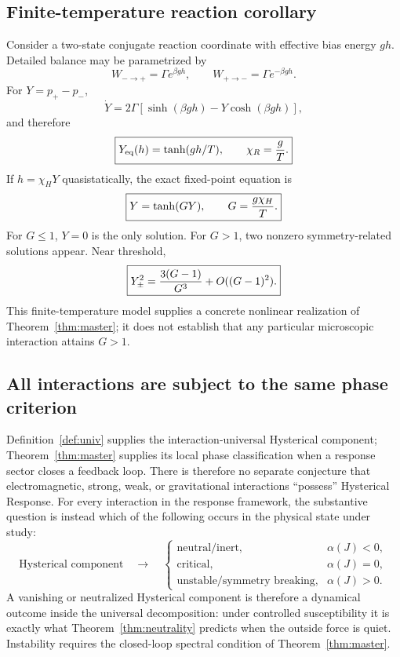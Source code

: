 \documentclass[11pt]{article}
\theoremstyle{definition}
\theoremstyle{remark}
\begin{document}
\subsection{Finite-temperature reaction corollary}
Consider a two-state conjugate reaction coordinate with effective bias energy $gh$.  Detailed balance may be parametrized by
\begin{equation}
 W_{-\to+}=\Gamma e^{\beta gh},\qquad
 W_{+\to-}=\Gamma e^{-\beta gh}.
\end{equation}
For $Y=p_+-p_-$,
\begin{equation}
 \dot Y=2\Gamma\left[\sinh(\beta gh)-Y\cosh(\beta gh)\right],
\end{equation}
and therefore
\begin{equation}
 \boxed{Y_{\rm eq}(h)=\tanh(gh/T),\qquad \chi_R={g\over T}.}
\end{equation}
If $h=\chi_HY$ quasistatically, the exact fixed-point equation is
\begin{equation}
 \boxed{Y=\tanh(GY),\qquad G={g\chi_H\over T}.}
 \label{eq:tanh}
\end{equation}
For $G\le1$, $Y=0$ is the only solution.  For $G>1$, two nonzero symmetry-related solutions appear.  Near threshold,
\begin{equation}
 \boxed{Y_\pm^2={3(G-1)\over G^3}+O((G-1)^2).}
\end{equation}
This finite-temperature model supplies a concrete nonlinear realization of Theorem~\ref{thm:master}; it does not establish that any particular microscopic interaction attains $G>1$.

\subsection{All interactions are subject to the same phase criterion}
Definition~\ref{def:univ} supplies the interaction-universal Hysterical component; Theorem~\ref{thm:master} supplies its local phase classification when a response sector closes a feedback loop. There is therefore no separate conjecture that electromagnetic, strong, weak, or gravitational interactions ``possess'' Hysterical Response. For every interaction in the response framework, the substantive question is instead which of the following occurs in the physical state under study:
\begin{equation}
 \boxed{\text{Hysterical component}\quad\longrightarrow\quad
 \begin{cases}
 \text{neutral/inert}, & \alpha(J)<0,\\
 \text{critical}, & \alpha(J)=0,\\
 \text{unstable/symmetry breaking}, & \alpha(J)>0.
 \end{cases}}
 \label{eq:univphase}
\end{equation}
A vanishing or neutralized Hysterical component is therefore a dynamical outcome inside the universal decomposition: under controlled susceptibility it is exactly what Theorem~\ref{thm:neutrality} predicts when the outside force is quiet.
Instability requires the closed-loop spectral condition of Theorem~\ref{thm:master}.
\end{document}
